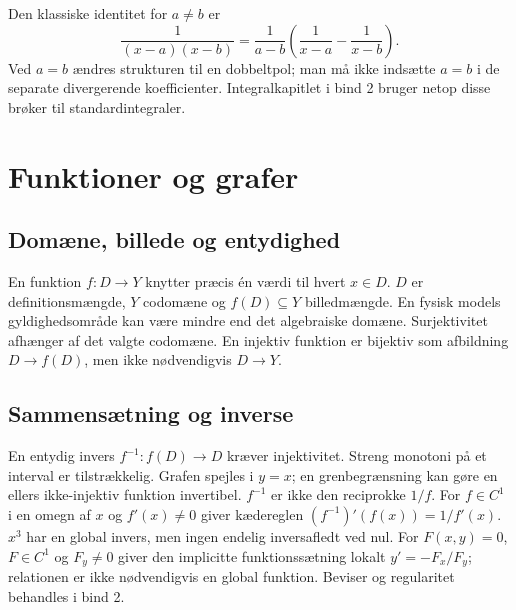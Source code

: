 Den klassiske identitet for $a\ne b$ er
\[
\frac1{(x-a)(x-b)}=\frac1{a-b}
\left(\frac1{x-a}-\frac1{x-b}\right).
\]
Ved $a=b$ ændres strukturen til en dobbeltpol; man må ikke indsætte
$a=b$ i de separate divergerende koefficienter.
Integralkapitlet i bind 2 bruger netop disse brøker til standardintegraler.

\section{Funktioner og grafer}
\label{sec:b1-funktioner}
\subsection{Domæne, billede og entydighed}
En funktion $f:D\to Y$ knytter præcis én værdi til hvert $x\in D$.
$D$ er definitionsmængde, $Y$ codomæne og $f(D)\subseteq Y$ billedmængde.
En fysisk models gyldighedsområde kan være mindre end det algebraiske domæne.
Surjektivitet afhænger af det valgte codomæne. En injektiv funktion er
bijektiv som afbildning $D\to f(D)$, men ikke nødvendigvis $D\to Y$.






\subsection{Sammensætning og inverse}
En entydig invers $f^{-1}:f(D)\to D$ kræver injektivitet.
Streng monotoni på et interval er tilstrækkelig. Grafen spejles i $y=x$;
en grenbegrænsning kan gøre en ellers ikke-injektiv funktion invertibel.
$f^{-1}$ er ikke den reciprokke $1/f$.
For $f\in C^1$ i en omegn af $x$ og $f'(x)\ne0$
giver kædereglen $(f^{-1})'(f(x))=1/f'(x)$.
$x^3$ har en global invers, men ingen endelig inversafledt ved nul.
For $F(x,y)=0$, $F\in C^1$ og $F_y\ne0$ giver den implicitte
funktionssætning lokalt $y'=-F_x/F_y$; relationen er ikke nødvendigvis en
global funktion. Beviser og regularitet behandles i bind 2.

